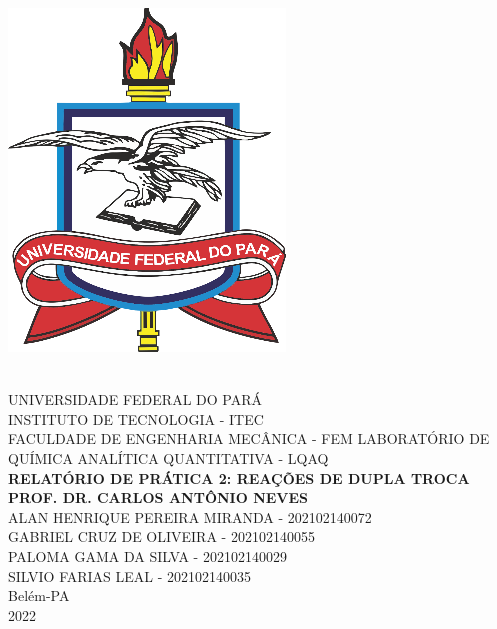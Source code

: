\documentclass[a4paper, 11pt]{article}
\begin{document}
\thispagestyle{empty}

    \begin{center}
        \parbox{3cm}{\includegraphics[scale=1]{logo_ufpa}}\\
        \vspace{1cm}
        \Large \uppercase{Universidade Federal do Pará}\\
        \Large \uppercase{Instituto de Tecnologia - ITEC}\\
        \vspace{2.5cm}
        \Large \uppercase{Faculdade de Engenharia Mecânica - FEM}
        \Large \uppercase{Laboratório de Química Analítica Quantitativa - LQAQ}\\
        \vspace{2.5cm}
        \Large \textbf{\uppercase {Relatório de Prática 2: Reações de Dupla Troca}} \\
        \Large \textbf{\uppercase {PROF. DR. Carlos Antônio Neves}} \\
        \vspace{2.5cm}
        \Large \uppercase {Alan Henrique Pereira Miranda - 202102140072}\\
        \Large \uppercase {Gabriel Cruz de Oliveira - 202102140055}\\
        \Large \uppercase {Paloma Gama da Silva - 202102140029}\\
        \Large \uppercase {Silvio Farias Leal - 202102140035}\\
        \vspace{1cm}
        \Large {Belém-PA \\ 2022}

    \end{center}
\end{document}
